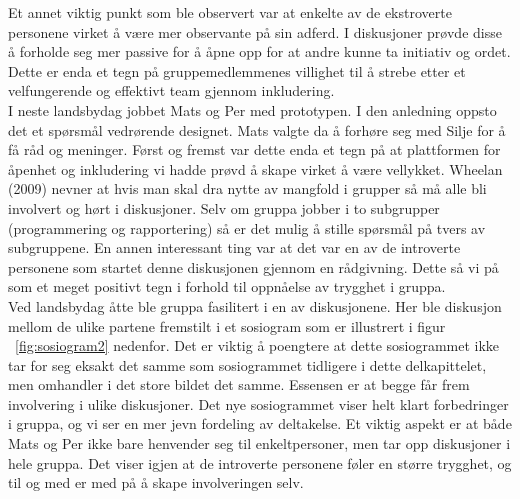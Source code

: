 Et annet viktig punkt som ble observert var at enkelte av de ekstroverte personene virket å være mer observante på sin adferd. I diskusjoner prøvde disse å forholde seg mer passive for å åpne opp for at andre kunne ta initiativ og ordet. Dette er enda et tegn på gruppemedlemmenes villighet til å strebe etter et velfungerende og effektivt team gjennom inkludering.\\

I neste landsbydag jobbet Mats og Per med prototypen. I den anledning oppsto det et spørsmål vedrørende designet. Mats valgte da å forhøre seg med Silje for å få råd og meninger. Først og fremst var dette enda et tegn på at plattformen for åpenhet og inkludering vi hadde prøvd å skape virket å være vellykket. Wheelan (2009)\cite{effectiveTeams} nevner at hvis man skal dra nytte av mangfold i grupper så må alle bli involvert og hørt i diskusjoner. Selv om gruppa jobber i to subgrupper (programmering og rapportering) så er det mulig å stille spørsmål på tvers av subgruppene. En annen interessant ting var at det var en av de introverte personene som startet denne diskusjonen gjennom en rådgivning. Dette så vi på som et meget positivt tegn i forhold til oppnåelse av trygghet i gruppa.\\

Ved landsbydag åtte ble gruppa fasilitert i en av diskusjonene. Her ble diskusjon mellom de ulike partene fremstilt i et sosiogram som er illustrert i figur ~\ref{fig:sosiogram2} nedenfor. Det er viktig å poengtere at dette sosiogrammet ikke tar for seg eksakt det samme som sosiogrammet tidligere i dette delkapittelet, men omhandler i det store bildet det samme. Essensen er at begge får frem involvering i ulike diskusjoner. Det nye sosiogrammet viser helt klart forbedringer i gruppa, og vi ser en mer jevn fordeling av deltakelse. Et viktig aspekt er at både Mats og Per ikke bare henvender seg  til enkeltpersoner, men tar opp diskusjoner i hele gruppa. Det viser igjen at de introverte personene føler en større trygghet, og til og med er med på å skape involveringen selv.\\

